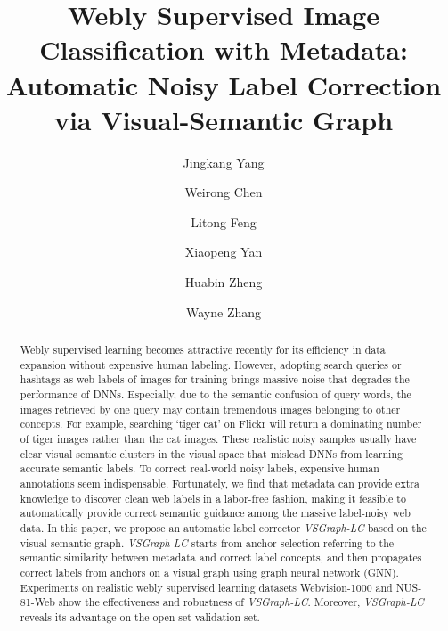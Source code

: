\documentclass[sigconf]{acmart}
\begin{document}
\fancyhead{}

\title{Webly Supervised Image Classification with Metadata: Automatic Noisy Label Correction via Visual-Semantic Graph}
\author{Jingkang Yang}
    
    \author{Weirong Chen}
    \authornotemark[1]
    
    \author{Litong Feng}
    
    \author{Xiaopeng Yan}
    
    \author{Huabin Zheng}
    
    \author{Wayne Zhang}

\renewcommand{\shortauthors}{J. Yang and W. Chen, et al.}

\begin{abstract}
    Webly supervised learning becomes attractive recently for its efficiency in data expansion without expensive human labeling. However, adopting search queries or hashtags as web labels of images for training brings massive noise that degrades the performance of DNNs.
    Especially, due to the semantic confusion of query words, the images retrieved by one query may contain tremendous images belonging to other concepts.
    For example, searching `tiger cat' on Flickr will return a dominating number of tiger images rather than the cat images.
    These realistic noisy samples usually have clear visual semantic clusters in the visual space that mislead DNNs from learning accurate semantic labels.
    To correct real-world noisy labels, expensive human annotations seem indispensable.
    Fortunately, we find that metadata can provide extra knowledge to discover clean web labels in a labor-free fashion, making it feasible to automatically provide correct semantic guidance among the massive label-noisy web data. In this paper, we propose an automatic label corrector \emph{VSGraph-LC} based on the visual-semantic graph. \emph{VSGraph-LC} starts from anchor selection referring to the semantic similarity between metadata and correct label concepts, and then propagates correct labels from anchors on a visual graph using graph neural network (GNN).
    Experiments on realistic webly supervised learning datasets Webvision-1000 and NUS-81-Web show the effectiveness and robustness of \emph{VSGraph-LC}. Moreover, \emph{VSGraph-LC} reveals its advantage on the open-set validation set.
\end{abstract}
\end{document}
